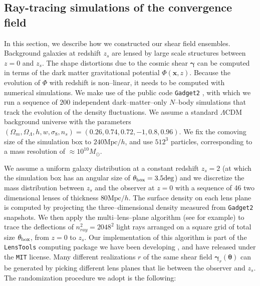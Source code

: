 \documentclass[reprint,aps,prd,superscriptaddress,showkeys,showpacs]{revtex4-1}
\newcommand{\bb}[1]{\mathbf{#1}}
\begin{document}
\subsection{Ray-tracing simulations of the convergence field}
\label{shearsim}
%
In this section, we describe how we constructed our shear field
ensembles. Background galaxies at redshift $z_s$ are lensed by large
scale structures between $z=0$ and $z_s$. The shape distortions due to
the cosmic shear $\pmb{\gamma}$ can be computed in terms of the dark
matter gravitational potential $\Phi(\bb{x},z)$. Because the evolution
of $\Phi$ with redshift is non--linear, it needs to be computed with
numerical simulations. We make use of the public code \texttt{Gadget2}
\citep{Gadget2}, with which we run a sequence of $200$ independent
dark--matter--only $N$--body simulations that track the evolution of
the density fluctuations. We assume a standard $\Lambda$CDM background
universe with the parameters
$(\Omega_m,\Omega_\Lambda,h,w,\sigma_8,n_s)=(0.26,0.74,0.72,-1,0.8,0.96)$.
We fix the comoving size of the simulation box to $240\mathrm{Mpc}/h$,
and use $512^3$ particles, corresponding to a mass resolution of
$\approx 10^{10}M_\odot$.

We assume a uniform galaxy distribution at a constant redshift $z_s=2$
(at which the simulation box has an angular size of $\theta_{\rm
  box}=3.5\mathrm{deg}$) and we discretize the mass distribution
between $z_s$ and the observer at $z=0$ with a sequence of 46 two
dimensional lenses of thickness $80\mathrm{Mpc}/h$. The surface
density on each lens plane is computed by projecting the
three--dimensional density measured from \texttt{Gadget2}
snapshots. We then apply the multi--lens--plane algorithm (see
\citep{RayTracingHartlap,RayTracingJain} for example) to trace the
deflections of $n_{ray}^2=2048^2$ light rays arranged on a square grid
of total size $\theta_{\rm box}$, from $z=0$ to $z_s$. Our
implementation of this algorithm is part of the \texttt{LensTools}
computing package we have been developing \citep{LensTools}, and have
released under the \texttt{MIT} license. Many different realizations
$r$ of the same shear field $\pmb{\gamma}_r(\pmb{\theta})$ can be
generated by picking different lens planes that lie between the
observer and $z_s$. The randomization procedure we adopt is the
following:
\end{document}
